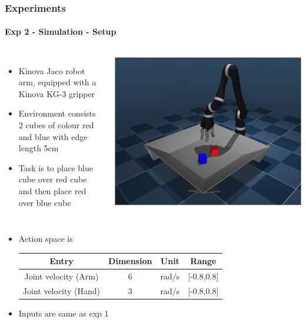 \documentclass{beamer}
\begin{document}
\begin{frame}
	\frametitle{Experiments}
	\framesubtitle{Exp 2 - Simulation - Setup}
	
	\begin{columns}[c]
		
		
		\begin{itemize}
			\item Kinova Jaco robot arm, equipped with a Kinova KG-3 gripper
			\item Environment consists 2 cubes of colour red and blue with edge length 5cm
			\item Task is to place blue cube over red cube and then place red over blue cube
		\end{itemize}
		
		\includegraphics[scale=0.2]{sim2.png}
		
	\end{columns}
	
	\begin{itemize}
		\item Action space is
		\begin{center}
			\begin{tabular}{cccc}
				\hline 
				Entry & Dimension & Unit & Range \\ 
				\hline 
				Joint velocity (Arm) & 6 & rad/s & [-0.8,0.8] \\ 
				\hline 
				Joint velocity (Hand) & 3 & rad/s & [-0.8,0.8] \\ 
				\hline 
			\end{tabular} 
		\end{center}
		\item Inputs are same as exp 1
	\end{itemize}
\end{frame}
\end{document}
